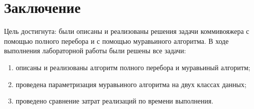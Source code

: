 \chapter*{Заключение}

Цель достигнута: были описаны и реализованы решения задачи коммивояжера с помощью полного перебора и с помощью муравьиного алгоритма.
В ходе выполнения лабораторной работы были решены все задачи:
\begin{enumerate}
	\item описаны и реализованы алгоритм полного перебора и муравьиный алгоритм;
	\item проведена параметризация муравьиного алгоритма на двух классах данных;
	\item проведено сравнение затрат реализаций по времени выполнения.
\end{enumerate}




